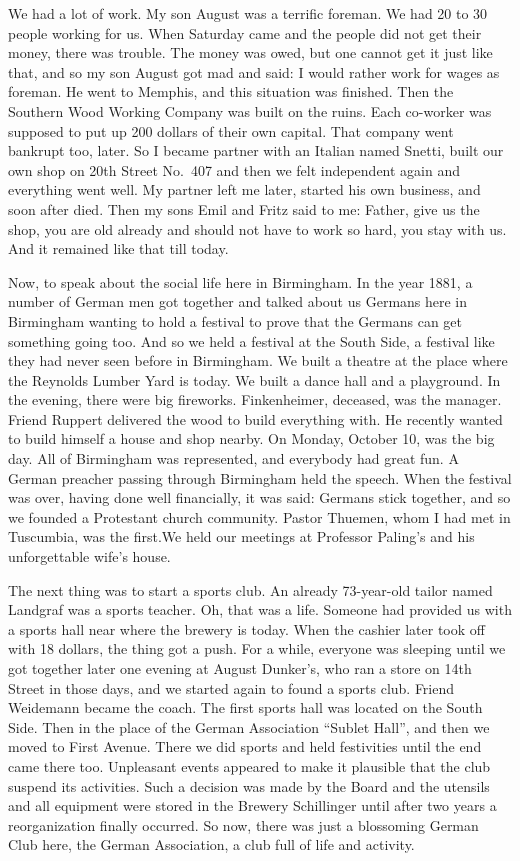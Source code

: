\documentclass{article}
\begin{document}
We had a lot of work. My son August was a terrific foreman. We had 20 to 30 people working for us. When Saturday came and the people did not get their money, there was trouble. The money was owed, but one cannot get it just like that, and so my son August got mad and said: I would rather work for wages as foreman. He went to Memphis, and this situation was finished. Then the Southern Wood Working Company was built on the ruins. Each co-worker was supposed to put up 200 dollars of their own capital. That company went bankrupt too, later. So I became partner with an Italian named Snetti, built our own shop on 20th Street No.~407 and then we felt independent again and everything went well. My partner left me later, started his own business, and soon after died. Then my sons Emil and Fritz said to me: Father, give us the shop, you are old already and should not have to work so hard, you stay with us. And it remained like that till today.

Now, to speak about the social life here in Birmingham. In the year 1881, a number of German men got together and talked about us Germans here in Birmingham wanting to hold a festival to prove that the Germans can get something going too. And so we held a festival at the South Side, a festival like they had never seen before in Birmingham. We built a theatre at the place where the Reynolds Lumber Yard is today. We built a dance hall and a playground. In the evening, there were big fireworks. Finkenheimer, deceased, was the manager. Friend Ruppert delivered the wood to build everything with. He recently wanted to build himself a house and shop nearby. On Monday, October 10, was the big day. All of Birmingham was represented, and everybody had great fun. A German preacher passing through Birmingham held the speech. When the festival was over, having done well financially, it was said: Germans stick together, and so we founded a Protestant church community. Pastor Thuemen, whom I had met in Tuscumbia, was the first.We held our meetings at Professor Paling's and his unforgettable wife's house.

The next thing was to start a sports club. An already 73-year-old tailor named Landgraf was a sports teacher. Oh, that was a life. Someone had provided us with a sports hall near where the brewery is today. When the cashier later took off with 18 dollars, the thing got a push. For a while, everyone was sleeping until we got together later one evening at August Dunker's, who ran a store on 14th Street in those days, and we started again to found a sports club. Friend Weidemann became the coach. The first sports hall was located on the South Side. Then in the place of the German Association ``Sublet Hall'', and then we moved to First Avenue. There we did sports and held festivities until the end came there too. Unpleasant events appeared to make it plausible that the club suspend its activities. Such a decision was made by the Board and the utensils and all equipment were stored in the Brewery Schillinger until after two years a reorganization finally occurred. So now, there was just a blossoming German Club here, the German Association, a club full of life and activity.
\end{document}
